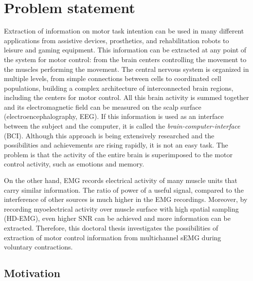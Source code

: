 \chapter{Problem statement}

Extraction of information on motor task intention can be used in many different applications from assistive devices, prosthetics, and rehabilitation robots to leisure and gaming equipment. This information can be extracted at any point of the system for motor control: from the brain centers controlling the movement to the muscles performing the movement. The central nervous system is organized in multiple levels, from simple connections between cells to coordinated cell populations, building a complex architecture of interconnected brain regions, including the centers for motor control. All this brain activity is summed together and its electromagnetic field can be measured on the scalp surface (electroencephalography, EEG). If this information is used as an interface between the subject and the computer, it is called the \emph{brain-computer-interface} (BCI). Although this approach is being extensively researched and the possibilities and achievements are rising rapidly, it is not an easy task. The problem is that the activity of the entire brain is superimposed to the motor control activity, such as emotions and memory.

On the other hand, EMG records electrical activity of many muscle units that carry similar information. The ratio of power of a useful signal, compared to the interference of other sources is much higher in the EMG recordings. Moreover, by recording myoelectrical activity over muscle surface with high spatial sampling (HD-EMG), even higher SNR can be achieved and more information can be extracted. Therefore, this doctoral thesis investigates the possibilities of extraction of motor control information from multichannel sEMG during voluntary contractions.

    
    
    \section{Motivation}
    

